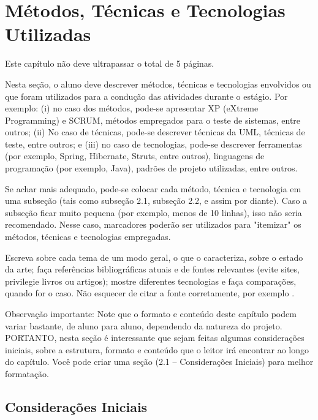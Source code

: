 \chapter{Métodos, Técnicas e Tecnologias Utilizadas}

Este capítulo não deve ultrapassar o total de 5 páginas.

Nesta seção,  o aluno deve  descrever métodos, técnicas  e tecnologias
envolvidos  ou que  foram utilizados  para a  condução das  atividades
durante  o estágio.  Por exemplo:  (i)  no caso  dos métodos,  pode-se
apresentar XP (eXtreme Programming) e SCRUM, métodos empregados para o
teste de  sistemas, entre  outros; (ii) No  caso de  técnicas, pode-se
descrever técnicas da UML, técnicas de teste, entre outros; e (iii) no
caso  de  tecnologias,  pode-se descrever  ferramentas  (por  exemplo,
Spring, Hibernate,  Struts, entre  outros), linguagens  de programação
(por exemplo, Java), padrões de projeto utilizadas, entre outros.

Se  achar  mais  adequado,  pode-se colocar  cada  método,  técnica  e
tecnologia em  uma subseção (tais  como subseção 2.1, subseção  2.2, e
assim por diante).  Caso a subseção ficar muito  pequena (por exemplo,
menos  de  10  linhas),  isso   não  seria  recomendado.  Nesse  caso,
marcadores poderão ser utilizados para "itemizar" os métodos, técnicas
e tecnologias empregadas.

Escreva sobre cada tema de um modo geral, o que o caracteriza, sobre o
estado da  arte; faça  referências bibliográficas  atuais e  de fontes
relevantes  (evite  sites,  privilegie   livros  ou  artigos);  mostre
diferentes  tecnologias e  faça comparações,  quando for  o caso.  Não
esquecer de citar a fonte corretamente, por exemplo \cite{silva:12}.

Observação importante:  Note que o  formato e conteúdo  deste capítulo
podem variar bastante, de aluno  para aluno, dependendo da natureza do
projeto. PORTANTO, nesta seção é interessante que sejam feitas algumas
considerações iniciais,  sobre a estrutura,  formato e conteúdo  que o
leitor irá encontrar  ao longo do capítulo. Você pode  criar uma seção
(2.1 – Considerações Iniciais) para melhor formatação.


\section{Considerações Iniciais}
